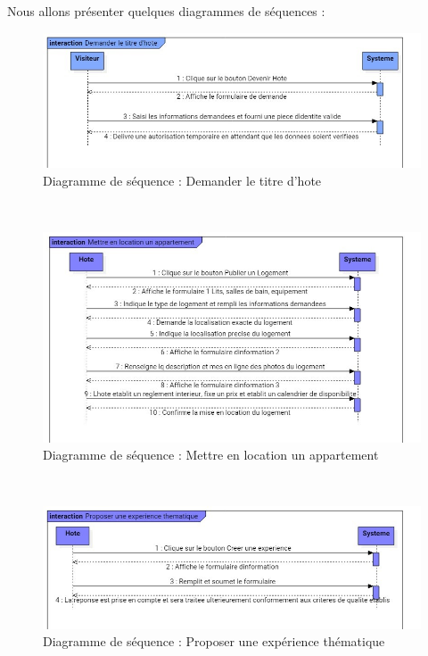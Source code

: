 Nous allons présenter quelques diagrammes de séquences :
\begin{figure}[H]
	\begin{center}
		\includegraphics[width=18cm]{images/uml/SeqDemanderTitreHote.jpg}
	\end{center}
	\caption{Diagramme de séquence : Demander le titre d’hote}
\end{figure}
$ $
\begin{figure}[H]
	\begin{center}
		\includegraphics[width=18cm]{images/uml/SeqMettreLocationAppartement.jpg}
	\end{center}
	\caption{Diagramme de séquence : Mettre en location un appartement}
\end{figure}
$ $
\begin{figure}[H]
	\begin{center}
		\includegraphics[width=18cm]{images/uml/SeqProposerExperienceThematique.jpg}
	\end{center}
	\caption{Diagramme de séquence : Proposer une expérience thématique}
\end{figure}
